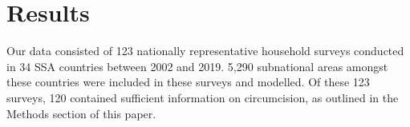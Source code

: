 \documentclass{article}
\begin{document}



\section{Results}
\label{sec:orgfc68fc8}



Our data consisted of 123 nationally representative household surveys conducted in 34 SSA countries between
2002 and 2019. 5,290 subnational areas amongst these countries were included in these surveys and modelled.
Of these 123 surveys, 120 contained sufficient information on circumcision, as outlined in the Methods section
of this paper.
\end{document}
